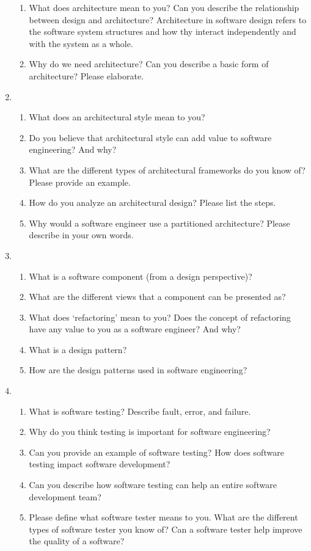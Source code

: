 \documentclass[12pt]{article}
\begin{document}
\begin{enumerate}
\begin{enumerate}[start=1,align=left]
      \item What does architecture mean to you? Can you describe the relationship between design and architecture?
      Architecture in software design refers to the software system structures and how thy interact independently and with the system as a whole.

      \item Why do we need architecture? Can you describe a basic form of architecture? Please elaborate.
    \end{enumerate}

    \item
    \begin{enumerate}[start=1,align=left]
      \item What does an architectural style mean to you? 
      \item Do you believe that architectural style can add value to software engineering? And why? 
      \item What are the different types of architectural frameworks do you know of? Please provide an example. 
      \item How do you analyze an architectural design? Please list the steps. 
      \item Why would a software engineer use a partitioned architecture? Please describe in your own words.
    \end{enumerate}

    \item
    \begin{enumerate}[start=1,align=left]
      \item What is a software component (from a design perspective)? 
      \item What are the different views that a component can be presented as? 
      \item What does ‘refactoring’ mean to you? Does the concept of refactoring have any value to you as a software engineer? And why? 
      \item What is a design pattern? 
      \item How are the design patterns used in software engineering?
    \end{enumerate}

    \item
    \begin{enumerate}[start=1,align=left]
      \item What is software testing? Describe fault, error, and failure. 
      \item Why do you think testing is important for software engineering? 
      \item Can you provide an example of software testing? How does software testing impact software development? 
      \item Can you describe how software testing can help an entire software development team? 
      \item Please define what software tester means to you. What are the different types of software tester you know of? Can a software tester help improve the quality of a software?
    \end{enumerate}


\end{enumerate}
\end{document}
